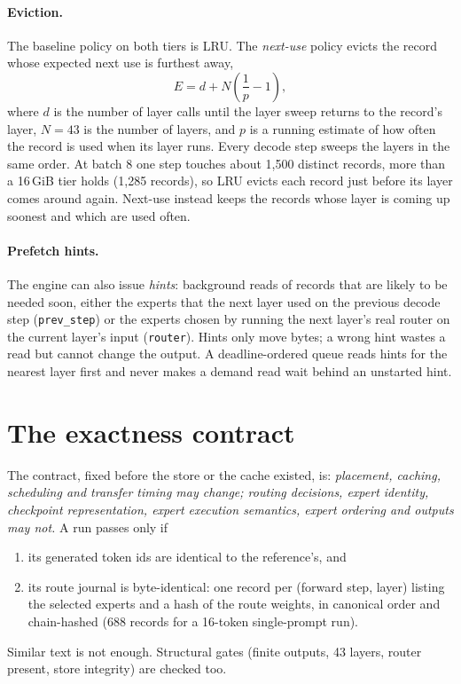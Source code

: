 \documentclass[11pt]{article}
\begin{document}
\paragraph{Eviction.} The baseline policy on both tiers is LRU. The
\emph{next-use} policy evicts the record whose expected next use is furthest away,
\begin{equation}
E = d + N\left(\frac{1}{p} - 1\right),
\end{equation}
where $d$ is the number of layer calls until the layer sweep returns to the
record's layer, $N=43$ is the number of layers, and $p$ is a running estimate of
how often the record is used when its layer runs. Every decode step sweeps the
layers in the same order. At batch 8 one step touches about 1,500 distinct
records, more than a 16\,GiB tier holds (1,285 records), so LRU evicts each
record just before its layer comes around again. Next-use instead keeps the
records whose layer is coming up soonest and which are used often.

\paragraph{Prefetch hints.} The engine can also issue \emph{hints}: background
reads of records that are likely to be needed soon, either the experts that the
next layer used on the previous decode step (\texttt{prev\_step}) or the
experts chosen by running the next layer's real router on the current layer's
input (\texttt{router}). Hints only move bytes; a wrong hint wastes a read but
cannot change the output. A deadline-ordered queue reads hints for the nearest
layer first and never makes a demand read wait behind an unstarted hint.

\section{The exactness contract}\label{sec:exact}

The contract, fixed before the store or the cache existed, is: \emph{placement,
caching, scheduling and transfer timing may change; routing decisions, expert
identity, checkpoint representation, expert execution semantics, expert
ordering and outputs may not.} A run passes only if
\begin{enumerate}
\item its generated token ids are identical to the reference's, and
\item its route journal is byte-identical: one record per (forward step, layer)
listing the selected experts and a hash of the route weights, in canonical
order and chain-hashed (688 records for a 16-token single-prompt run).
\end{enumerate}
Similar text is not enough. Structural gates (finite outputs, 43 layers, router
present, store integrity) are checked too.
\end{document}
